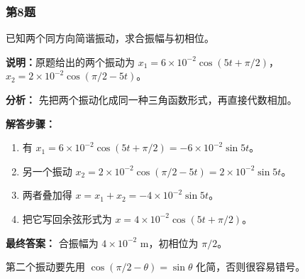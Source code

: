 \documentclass[12pt,a4paper]{ctexart}
\begin{document}
\subsubsection*{第8题}
\begin{tcolorbox}[colback=gray!2!white,colframe=black!60,title={题目}]
已知两个同方向简谐振动，求合振幅与初相位。\par
\vspace{0.4em}
\textbf{说明：}原题给出的两个振动为 \(x_1=6\times 10^{-2}\cos(5t+\pi/2)\)，\(x_2=2\times 10^{-2}\cos(\pi/2-5t)\)。\par
\end{tcolorbox}
\begin{tcolorbox}[colback=blue!2!white,colframe=blue!55!black,title={完整答案}]
\textbf{分析：}
先把两个振动化成同一种三角函数形式，再直接代数相加。\par
\textbf{解答步骤：}
\begin{enumerate}
\item 有 \(x_1=6\times 10^{-2}\cos(5t+\pi/2)=-6\times 10^{-2}\sin 5t\)。
\item 另一个振动 \(x_2=2\times 10^{-2}\cos(\pi/2-5t)=2\times 10^{-2}\sin 5t\)。
\item 两者叠加得 \(x=x_1+x_2=-4\times 10^{-2}\sin 5t\)。
\item 把它写回余弦形式为 \(x=4\times 10^{-2}\cos(5t+\pi/2)\)。
\end{enumerate}
\textbf{最终答案：}
合振幅为 \(4\times 10^{-2}\text{ m}\)，初相位为 \(\pi/2\)。\par
\end{tcolorbox}
\begin{tcolorbox}[colback=red!2!white,colframe=red!55!black,title={易错点}]
第二个振动要先用 \(\cos(\pi/2-\theta)=\sin\theta\) 化简，否则很容易错号。\par
\end{tcolorbox}
\end{document}
